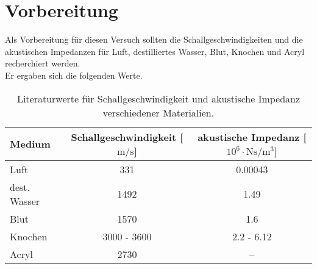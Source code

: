 \section{Vorbereitung}

    Als Vorbereitung für diesen Versuch sollten die Schallgeschwindigkeiten und die akustischen Impedanzen für Luft,
    destilliertes Wasser, Blut, Knochen und Acryl recherchiert werden.\\
    Er ergaben sich die folgenden Werte.

    \begin{table}
        \centering
        \caption{Literaturwerte für Schallgeschwindigkeit und akustische Impedanz verschiedener Materialien.}
        \label{tab:vorbereitung}
        \begin{tabular}{l S S}
            \toprule
            Medium &
            {Schallgeschwindigkeit [$\si{\meter\per\second}$]} &
            {akustische Impedanz [$10^6 \cdot \si{\newton\second\per\cubic\meter}$]} \\
            \midrule
            Luft         & 331 \cite{semmelweis} & 0.00043 \cite{semmelweis} \\
            dest. Wasser & 1492 \cite{semmelweis} & 1.49 \cite{semmelweis} \\
            Blut         & 1570 \cite{semmelweis} & 1.6 \cite{semmelweis} \\
            Knochen      & {\num{3000} - \num{3600}} \cite{semmelweis} & {\num{2.2} - \num{6.12}} \cite{semmelweis} \\
            Acryl        & 2730 & {–} \\
            \bottomrule
        \end{tabular}
    \end{table}
